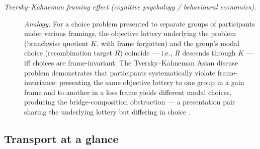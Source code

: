 \begin{description}
\item[\emph{Tversky--Kahneman framing effect (cognitive psychology
/ behavioural economics).}] \textit{Analogy.}
For a choice problem presented to separate groups of participants
under various framings, the objective lottery underlying the problem
(branchwise quotient \(K\), with frame forgotten) and the group's
modal choice (recombination target \(R\)) coincide --- i.e., \(R\)
descends through \(K\) --- iff choices are frame-invariant.  The Tversky--Kahneman Asian disease problem
demonstrates that participants systematically violate
frame-invariance: presenting the same objective lottery to one group in a gain frame
and to another in a loss frame yields different modal choices, producing the bridge-composition obstruction --- a
presentation pair sharing the underlying lottery but differing in
choice
\citep{TverskyKahneman1981Framing}.
\end{description}
\endgroup

\subsection*{Transport at a glance}\label{sec:transport:summary}

\FloatBarrier
